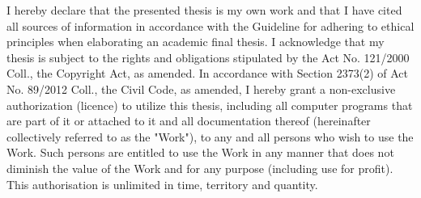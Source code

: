 \documentclass[english,master,unicode,bw]{ctufit-thesis}
\theoremstyle{plain}
\theoremstyle{definition}
\theoremstyle{remark}
\numberwithin{theorem}{chapter}
\begin{document}
\begin{declarationpage}
    I hereby declare that the presented thesis is my own work and that I have cited all sources of
    information in accordance with the Guideline for adhering to ethical principles when elaborating an
    academic final thesis.
    I acknowledge that my thesis is subject to the rights and obligations stipulated by the Act No.
    121/2000 Coll., the Copyright Act, as amended. In accordance with Section 2373(2) of Act No.
    89/2012 Coll., the Civil Code, as amended, I hereby grant a non-exclusive authorization (licence) to
    utilize this thesis, including all computer programs that are part of it or attached to it and all
    documentation thereof (hereinafter collectively referred to as the "Work"), to any and all persons
    who wish to use the Work. Such persons are entitled to use the Work in any manner that does not
    diminish the value of the Work and for any purpose (including use for profit). This authorisation is
    unlimited in time, territory and quantity.
\end{declarationpage}

\printabstractpage %




\end{document}
